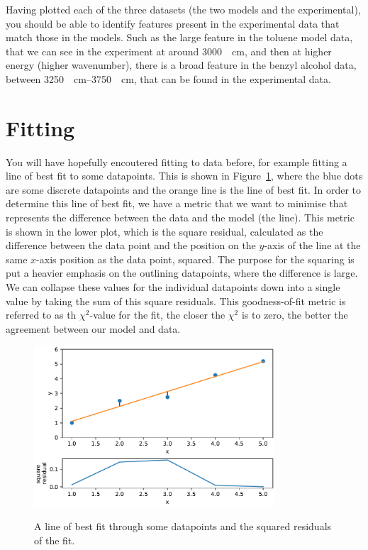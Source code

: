 \documentclass[a4paper]{article}
\begin{document}
Having plotted each of the three datasets (the two models and the experimental), you should be able to identify features present in the experimental data that match those in the models. 
Such as the large feature in the toluene model data, that we can see in the experiment at around \SI{3000}{\per\centi\meter}, and then at higher energy (higher wavenumber), there is a broad feature in the benzyl alcohol data, between \SIrange{3250}{3750}{\per\centi\meter}, that can be found in the experimental data. 

\section{Fitting}
You will have hopefully encoutered fitting to data before, for example fitting a line of best fit to some datapoints.
This is shown in Figure~\ref{fig:plot}, where the blue dots are some discrete datapoints and the orange line is the line of best fit. 
In order to determine this line of best fit, we have a metric that we want to minimise that represents the difference between the data and the model (the line).
This metric is shown in the lower plot, which is the square residual, calculated as the difference between the data point and the position on the $y$-axis of the line at the same $x$-axis position as the data point, squared.
The purpose for the squaring is put a heavier emphasis on the outlining datapoints, where the difference is large. 
We can collapse these values for the individual datapoints down into a single value by taking the sum of this square residuals.
This goodness-of-fit metric is referred to as th $\chi^2$-value for the fit, the closer the $\chi^2$ is to zero, the better the agreement between our model and data. 
%
\begin{figure}[t]
  \centering
  \includegraphics[width=0.8\textwidth]{residual}
  \label{fig:plot}
  \caption{A line of best fit through some datapoints and the squared residuals of the fit.}
  \end{figure}
%
\end{document}
